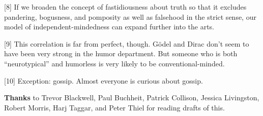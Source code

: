 {[}8{]} If we broaden the concept of fastidiousness about truth so that
it excludes pandering, bogusness, and pomposity as well as falsehood in
the strict sense, our model of independent-mindedness can expand further
into the arts.

{[}9{]} This correlation is far from perfect, though. Gödel and Dirac
don't seem to have been very strong in the humor department. But someone
who is both ``neurotypical'' and humorless is very likely to be
conventional-minded.

{[}10{]} Exception: gossip. Almost everyone is curious about gossip.

\textbf{Thanks} to Trevor Blackwell, Paul Buchheit, Patrick Collison,
Jessica Livingston, Robert Morris, Harj Taggar, and Peter Thiel for
reading drafts of this.
